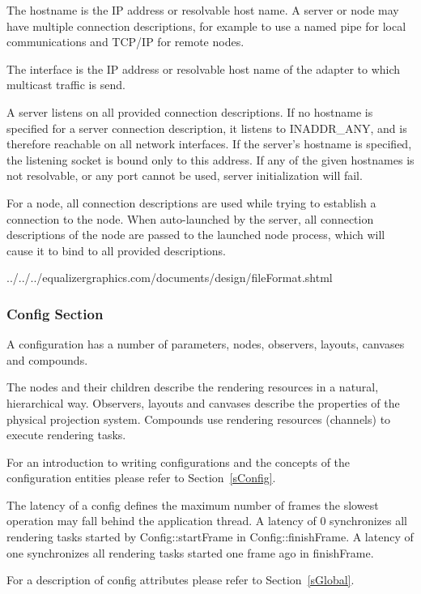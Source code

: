 \documentclass[10pt,a4]{scrartcl}
\newcommand{\sref}[1]{Section~\ref{#1}}
\begin{document}
The hostname is the IP address or resolvable host name. A server or
node may have multiple connection descriptions, for example to use a
named pipe for local communications and TCP/IP for remote nodes.

The interface is the IP address or resolvable host name of the adapter to which
multicast traffic is send.

A server listens on all provided connection descriptions. If no hostname
is specified for a server connection description, it listens to
INADDR\_ANY, and is therefore reachable on all network interfaces. If
the server's hostname is specified, the listening socket is bound only
to this address. If any of the given hostnames is not resolvable, or any
port cannot be used, server initialization will fail.

For a node, all connection descriptions are used while trying to
establish a connection to the node. When auto-launched by the server,
all connection descriptions of the node are passed to the launched node
process, which will cause it to bind to all provided descriptions.

{\footnotesize
  {../../../equalizergraphics.com/documents/design/fileFormat.shtml}}

\subsubsection{Config Section}

A configuration has a number of parameters, nodes, observers, layouts,
canvases and compounds.

The nodes and their children describe the rendering resources in a
natural, hierarchical way. Observers, layouts and canvases describe the
properties of the physical projection system. Compounds use rendering
resources (channels) to execute rendering tasks.

For an introduction to writing configurations and the concepts of the
configuration entities please refer to \sref{sConfig}.

The latency of a config defines the maximum number of frames the
slowest operation may fall behind the application thread. A latency of 0
synchronizes all rendering tasks started by \textsf{Config::startFrame}
in \textsf{Config::finishFrame}. A latency of one synchronizes all
rendering tasks started one frame ago in \textsf{finishFrame}.

For a description of config attributes please refer to \sref{sGlobal}.
\end{document}
